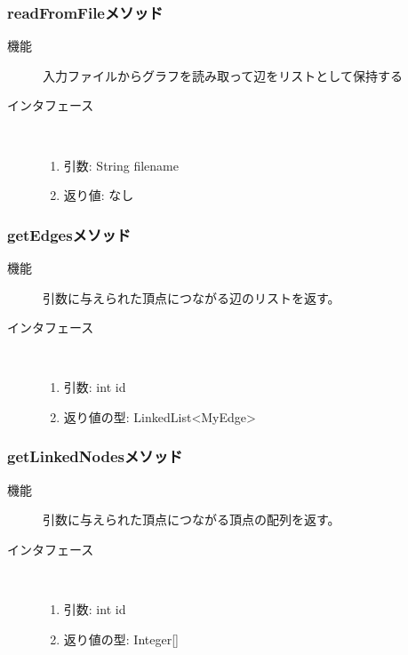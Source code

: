 \documentclass[a4j]{jarticle}
\begin{document}
\subsubsection{readFromFileメソッド}

\begin{description}
\item[機能]
入力ファイルからグラフを読み取って辺をリストとして保持する

\item[インタフェース]\ \vspace{0mm}
\begin{enumerate}
  \item 引数: String filename
  \item 返り値: なし
\end{enumerate}
\end{description}

\subsubsection{getEdgesメソッド}

\begin{description}
\item[機能]
引数に与えられた頂点につながる辺のリストを返す。

\item[インタフェース]\ \vspace{0mm}
\begin{enumerate}
  \item 引数: int id
  \item 返り値の型: LinkedList\textless MyEdge\textgreater
\end{enumerate}
\end{description}

\subsubsection{getLinkedNodesメソッド}

\begin{description}
\item[機能]
引数に与えられた頂点につながる頂点の配列を返す。

\item[インタフェース]\ \vspace{0mm}
\begin{enumerate}
  \item 引数: int id
  \item 返り値の型: Integer[]
\end{enumerate}
\end{description}
\end{document}
